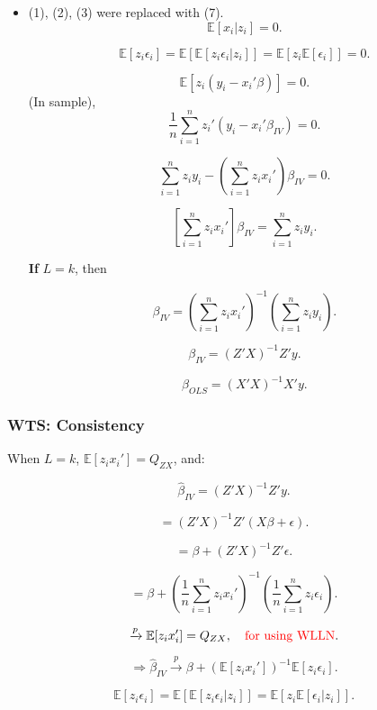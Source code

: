 \documentclass[12pt, oneside]{article}
\begin{document}
\begin{itemize}
    \item (1), (2), (3) were replaced with (7).
    \[
    \mathbb{E}[x_i | z_i] = 0.
    \]

    \[
    \mathbb{E}[z_i \epsilon_i] = \mathbb{E}[\mathbb{E}[z_i \epsilon_i | z_i]] = \mathbb{E}[z_i \mathbb{E}[\epsilon_i]] = 0.
    \]

    \[
    \mathbb{E}[z_i (y_i - x_i' \beta)] = 0.
    \]
    (In sample),
    \[
    \frac{1}{n} \sum_{i=1}^{n} z_i' (y_i - x_i' \beta_{IV}) = 0.
    \]

    \[
    \sum_{i=1}^{n} z_i y_i - \left( \sum_{i=1}^{n} z_i x_i' \right) \beta_{IV} = 0.
    \]
    
    \[
    \left[ \sum_{i=1}^{n} z_i x_i' \right] \beta_{IV} = \sum_{i=1}^{n} z_i y_i.
    \]

    \textbf{If} \( L = k \), then

    \[
    \beta_{IV} = \left( \sum_{i=1}^{n} z_i x_i' \right)^{-1} \left( \sum_{i=1}^{n} z_i y_i \right).
    \]

    \[
    \beta_{IV} = (Z'X)^{-1} Z' y.
    \]

    \[
    \beta_{OLS} = (X'X)^{-1} X' y.
    \]

\end{itemize}

\subsubsection{WTS: Consistency}

When \( L = k \), \( \mathbb{E}[z_i x_i'] = Q_{ZX} \), and:

\[
\hat{\beta}_{IV} = (Z'X)^{-1} Z' y.
\]

\[
= (Z'X)^{-1} Z' (X\beta + \epsilon).
\]

\[
= \beta + (Z'X)^{-1} Z' \epsilon.
\]

\[
= \beta + \left( \frac{1}{n} \sum_{i=1}^{n} z_i x_i' \right)^{-1} \left( \frac{1}{n} \sum_{i=1}^{n} z_i \epsilon_i \right).
\]

\[
\xrightarrow{p} \mathbb{E}[z_i x_i'] = Q_{ZX}, \quad \textcolor{red}{\text{for using WLLN}}.
\]

\[
\Rightarrow \hat{\beta}_{IV} \xrightarrow{p} \beta + (\mathbb{E}[z_i x_i'])^{-1} \mathbb{E}[z_i \epsilon_i].
\]

\[
\mathbb{E}[z_i \epsilon_i] = \mathbb{E}[\mathbb{E}[z_i \epsilon_i | z_i]] = \mathbb{E}[z_i \mathbb{E}[\epsilon_i | z_i]].
\]
\end{document}
